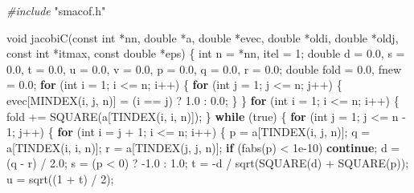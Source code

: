 \documentclass[12pt,]{article}
\newenvironment{Shaded}{\begin{snugshade}}{\end{snugshade}}
\newcommand{\DataTypeTok}[1]{\textcolor[rgb]{0.13,0.29,0.53}{#1}}
\newcommand{\DecValTok}[1]{\textcolor[rgb]{0.00,0.00,0.81}{#1}}
\newcommand{\FloatTok}[1]{\textcolor[rgb]{0.00,0.00,0.81}{#1}}
\newcommand{\ImportTok}[1]{#1}
\newcommand{\ControlFlowTok}[1]{\textcolor[rgb]{0.13,0.29,0.53}{\textbf{#1}}}
\newcommand{\PreprocessorTok}[1]{\textcolor[rgb]{0.56,0.35,0.01}{\textit{#1}}}
\newcommand{\NormalTok}[1]{#1}
\begin{document}
\begin{Shaded}
\begin{Highlighting}[]
\PreprocessorTok{#include }\ImportTok{"smacof.h"}

\DataTypeTok{void}\NormalTok{ jacobiC(}\DataTypeTok{const} \DataTypeTok{int}\NormalTok{ *nn, }\DataTypeTok{double}\NormalTok{ *a, }\DataTypeTok{double}\NormalTok{ *evec, }\DataTypeTok{double}\NormalTok{ *oldi, }\DataTypeTok{double}\NormalTok{ *oldj,}
             \DataTypeTok{const} \DataTypeTok{int}\NormalTok{ *itmax, }\DataTypeTok{const} \DataTypeTok{double}\NormalTok{ *eps) \{}
    \DataTypeTok{int}\NormalTok{ n = *nn, itel = }\DecValTok{1}\NormalTok{;}
    \DataTypeTok{double}\NormalTok{ d = }\FloatTok{0.0}\NormalTok{, s = }\FloatTok{0.0}\NormalTok{, t = }\FloatTok{0.0}\NormalTok{, u = }\FloatTok{0.0}\NormalTok{, v = }\FloatTok{0.0}\NormalTok{, p = }\FloatTok{0.0}\NormalTok{, q = }\FloatTok{0.0}\NormalTok{,}
\NormalTok{           r = }\FloatTok{0.0}\NormalTok{;}
    \DataTypeTok{double}\NormalTok{ fold = }\FloatTok{0.0}\NormalTok{, fnew = }\FloatTok{0.0}\NormalTok{;}
    \ControlFlowTok{for}\NormalTok{ (}\DataTypeTok{int}\NormalTok{ i = }\DecValTok{1}\NormalTok{; i <= n; i++) \{}
        \ControlFlowTok{for}\NormalTok{ (}\DataTypeTok{int}\NormalTok{ j = }\DecValTok{1}\NormalTok{; j <= n; j++) \{}
\NormalTok{            evec[MINDEX(i, j, n)] = (i == j) ? }\FloatTok{1.0}\NormalTok{ : }\FloatTok{0.0}\NormalTok{;}
\NormalTok{        \}}
\NormalTok{    \}}
    \ControlFlowTok{for}\NormalTok{ (}\DataTypeTok{int}\NormalTok{ i = }\DecValTok{1}\NormalTok{; i <= n; i++) \{}
\NormalTok{        fold += SQUARE(a[TINDEX(i, i, n)]);}
\NormalTok{    \}}
    \ControlFlowTok{while}\NormalTok{ (true) \{}
        \ControlFlowTok{for}\NormalTok{ (}\DataTypeTok{int}\NormalTok{ j = }\DecValTok{1}\NormalTok{; j <= n - }\DecValTok{1}\NormalTok{; j++) \{}
            \ControlFlowTok{for}\NormalTok{ (}\DataTypeTok{int}\NormalTok{ i = j + }\DecValTok{1}\NormalTok{; i <= n; i++) \{}
\NormalTok{                p = a[TINDEX(i, j, n)];}
\NormalTok{                q = a[TINDEX(i, i, n)];}
\NormalTok{                r = a[TINDEX(j, j, n)];}
                \ControlFlowTok{if}\NormalTok{ (fabs(p) < }\FloatTok{1e-10}\NormalTok{) }\ControlFlowTok{continue}\NormalTok{;}
\NormalTok{                d = (q - r) / }\FloatTok{2.0}\NormalTok{;}
\NormalTok{                s = (p < }\DecValTok{0}\NormalTok{) ? -}\FloatTok{1.0}\NormalTok{ : }\FloatTok{1.0}\NormalTok{;}
\NormalTok{                t = -d / sqrt(SQUARE(d) + SQUARE(p));}
\NormalTok{                u = sqrt((}\DecValTok{1}\NormalTok{ + t) / }\DecValTok{2}\NormalTok{);}

\end{Highlighting}
\end{Shaded}
\end{document}
